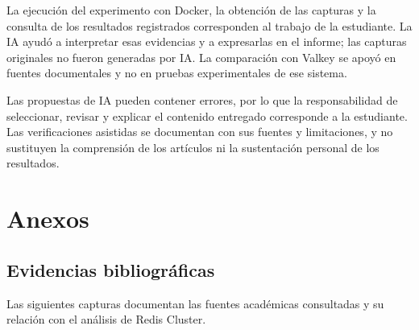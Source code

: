 \documentclass[12pt,a4paper]{article}
\begin{document}
La ejecución del experimento con Docker, la obtención de las capturas y la consulta de los resultados registrados corresponden al trabajo de la estudiante. La IA ayudó a interpretar esas evidencias y a expresarlas en el informe; las capturas originales no fueron generadas por IA. La comparación con Valkey se apoyó en fuentes documentales y no en pruebas experimentales de ese sistema.

Las propuestas de IA pueden contener errores, por lo que la responsabilidad de seleccionar, revisar y explicar el contenido entregado corresponde a la estudiante. Las verificaciones asistidas se documentan con sus fuentes y limitaciones, y no sustituyen la comprensión de los artículos ni la sustentación personal de los resultados.

\section{Anexos}
\subsection{Evidencias bibliográficas}
Las siguientes capturas documentan las fuentes académicas consultadas y su relación con el análisis de Redis Cluster.
\end{document}
